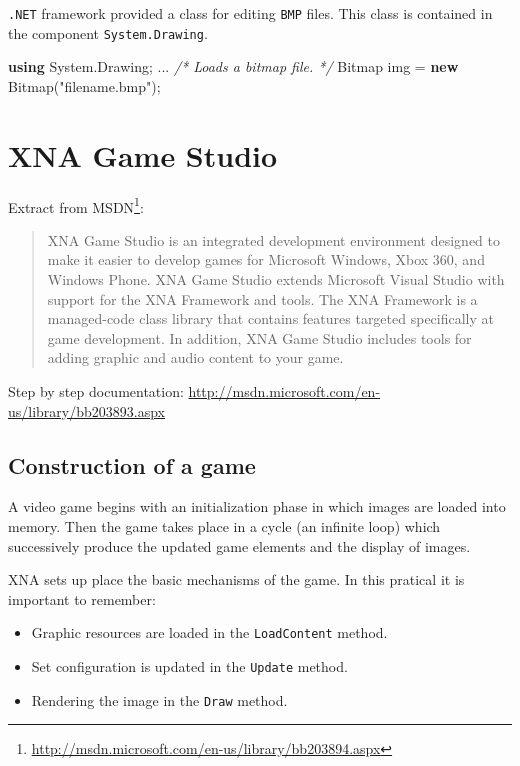 \documentclass[11pt, a4paper]{article}
\newenvironment{Shaded}{}{}
\newcommand{\KeywordTok}[1]{\textcolor[rgb]{0.00,0.44,0.13}{\textbf{{#1}}}}
\newcommand{\StringTok}[1]{\textcolor[rgb]{0.25,0.44,0.63}{{#1}}}
\newcommand{\CommentTok}[1]{\textcolor[rgb]{0.38,0.63,0.69}{\textit{{#1}}}}
\newcommand{\FunctionTok}[1]{\textcolor[rgb]{0.02,0.16,0.49}{{#1}}}
\newcommand{\NormalTok}[1]{{#1}}
\begin{document}
\texttt{.NET} framework provided a class for editing \texttt{BMP} files.
This class is contained in the component \texttt{System.Drawing}.

\begin{Shaded}
\begin{Highlighting}[]
\KeywordTok{using} \NormalTok{System.}\FunctionTok{Drawing}\NormalTok{;}
\NormalTok{...}
\CommentTok{/* Loads a bitmap file. */}
\NormalTok{Bitmap img = }\KeywordTok{new} \FunctionTok{Bitmap}\NormalTok{(}\StringTok{"filename.bmp"}\NormalTok{);}
\end{Highlighting}
\end{Shaded}
\section{XNA Game Studio}\label{xna-game-studio}

Extract from
MSDN\footnote{\url{http://msdn.microsoft.com/en-us/library/bb203894.aspx}}:

\begin{quote}
XNA Game Studio is an integrated development environment designed to make it easier to develop games for Microsoft Windows, Xbox 360, and Windows Phone. XNA Game Studio extends Microsoft Visual Studio with support for the XNA Framework and tools. The XNA Framework is a managed-code class library that contains features targeted specifically at game development. In addition, XNA Game Studio includes tools for adding graphic and audio content to your game.
\end{quote}

Step by step documentation:
\url{http://msdn.microsoft.com/en-us/library/bb203893.aspx}

\subsection{Construction of a game}\label{construction-of-a-game}

A video game begins with an initialization phase in which images are
loaded into memory. Then the game takes place in a cycle (an infinite
loop) which successively produce the updated game elements and the
display of images.

XNA sets up place the basic mechanisms of the game. In this pratical it
is important to remember:\newline

\begin{itemize}
\itemsep1pt\parskip0pt
\item
  Graphic resources are loaded in the \texttt{LoadContent} method.
\item
  Set configuration is updated in the \texttt{Update} method.
\item
  Rendering the image in the \texttt{Draw} method.\newline
\end{itemize}
\end{document}
